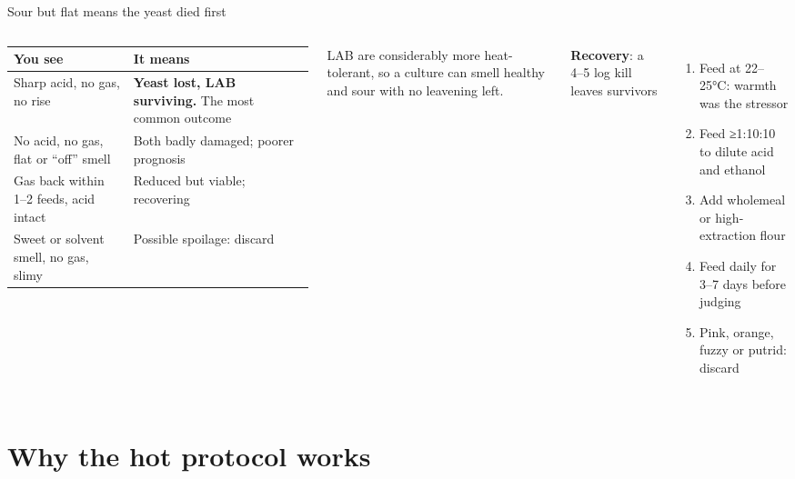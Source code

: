 \documentclass[aspectratio=169,11pt]{beamer}
\newcommand{\tablestart}[2]{\begingroup\renewcommand{\arraystretch}{#1}#2}
\newcommand{\tableend}{\endgroup\par}
\begin{document}
\begin{frame}{Sour but flat means the yeast died first}
  \begin{columns}[T]
      \tablestart{1.2}{\scriptsize}
      \begin{tabularx}{\linewidth}{@{}P{2.6cm}L@{}}
        \toprule
        \textbf{You see} & \textbf{It means} \\
        \midrule
        Sharp acid, no gas, no rise & \textbf{Yeast lost, LAB surviving.} The most
          common outcome \\
        No acid, no gas, flat or ``off'' smell & Both badly damaged; poorer prognosis \\
        Gas back within 1–2 feeds, acid intact & Reduced but viable; recovering \\
        Sweet or solvent smell, no gas, slimy & Possible spoilage: discard \\
        \bottomrule
      \end{tabularx}
      \tableend
      \smallskip
      {\footnotesize LAB are considerably more heat-tolerant, so a culture can smell
      healthy and sour with no leavening left.\par}
      {\color{crust}\textbf{Recovery}: a 4–5 log kill leaves survivors}\par
      \vspace{-0.6em}
      \begin{enumerate}\footnotesize\setlength{\itemsep}{1pt}
        \item Feed at 22–25°C: warmth was the stressor
        \item Feed ≥1:10:10 to dilute acid and ethanol
        \item Add wholemeal or high-extraction flour
        \item Feed daily for 3–7 days before judging
        \item Pink, orange, fuzzy or putrid: discard
      \end{enumerate}
  \end{columns}
\end{frame}

\section{Why the hot protocol works}
\end{document}
